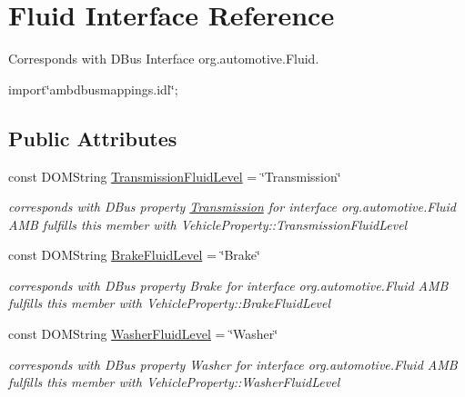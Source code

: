 \hypertarget{interfaceFluid}{\section{Fluid Interface Reference}
\label{interfaceFluid}
}


Corresponds with D\+Bus Interface org.\+automotive.\+Fluid.  




{\ttfamily import\char`\"{}ambdbusmappings.\+idl\char`\"{};}

\subsection*{Public Attributes}
\begin{DoxyCompactItemize}
\item 
\hypertarget{interfaceFluid_a6dfdefaa8d5ea2b2d13e99f4f9b8c642}{const D\+O\+M\+String \hyperlink{interfaceFluid_a6dfdefaa8d5ea2b2d13e99f4f9b8c642}{Transmission\+Fluid\+Level} = \char`\"{}Transmission\char`\"{}}\label{interfaceFluid_a6dfdefaa8d5ea2b2d13e99f4f9b8c642}

\begin{DoxyCompactList}\small\item\em corresponds with D\+Bus property \hyperlink{interfaceTransmission}{Transmission} for interface org.\+automotive.\+Fluid A\+M\+B fulfills this member with Vehicle\+Property\+::\+Transmission\+Fluid\+Level \end{DoxyCompactList}\item 
\hypertarget{interfaceFluid_a7514f249a3ca04b7d912b34499a7c7b2}{const D\+O\+M\+String \hyperlink{interfaceFluid_a7514f249a3ca04b7d912b34499a7c7b2}{Brake\+Fluid\+Level} = \char`\"{}Brake\char`\"{}}\label{interfaceFluid_a7514f249a3ca04b7d912b34499a7c7b2}

\begin{DoxyCompactList}\small\item\em corresponds with D\+Bus property Brake for interface org.\+automotive.\+Fluid A\+M\+B fulfills this member with Vehicle\+Property\+::\+Brake\+Fluid\+Level \end{DoxyCompactList}\item 
\hypertarget{interfaceFluid_aae5235a67d088bd771525f3cef6136ee}{const D\+O\+M\+String \hyperlink{interfaceFluid_aae5235a67d088bd771525f3cef6136ee}{Washer\+Fluid\+Level} = \char`\"{}Washer\char`\"{}}\label{interfaceFluid_aae5235a67d088bd771525f3cef6136ee}

\begin{DoxyCompactList}\small\item\em corresponds with D\+Bus property Washer for interface org.\+automotive.\+Fluid A\+M\+B fulfills this member with Vehicle\+Property\+::\+Washer\+Fluid\+Level \end{DoxyCompactList}\end{DoxyCompactItemize}


